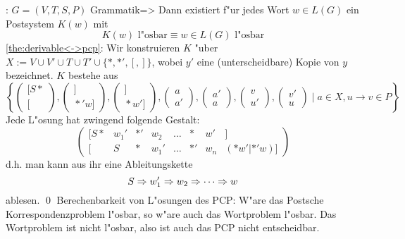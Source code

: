 \theorem:
  $G=(V,T,S,P)$ Grammatik=>{
  \label{the:derivable<->pcp}
  Dann existiert f"ur jedes Wort $w\in L(G)$ ein Postsystem $K(w)$ mit
  \[K(w)\text{ l"osbar}\equiv w\in L(G)\text{ l"osbar}
    \]
  }
\proof \ref{the:derivable<->pcp}:{
  Wir konstruieren $K$ "uber $X := V \cup V' \cup T
  \cup T' \cup \{*, *', [, ]\}$, wobei $y'$ eine (unterscheidbare) 
  Kopie von $y$ bezeichnet. $K$ bestehe aus
  \[\left\{
      \begin{pmatrix}[S*\\{}[\end{pmatrix},
      \begin{pmatrix}]\\{} *'w]\end{pmatrix},
      \begin{pmatrix}]\\{} *w']\end{pmatrix},
      \begin{pmatrix}a\\a'\end{pmatrix},
      \begin{pmatrix}a'\\a\end{pmatrix},
      \begin{pmatrix}v\\u'\end{pmatrix},
      \begin{pmatrix}v'\\u\end{pmatrix} \mid a \in X, u \to v \in P 
      \right\}
    \]
  Jede L"osung hat zwingend folgende Gestalt:
  \[\left(\begin{array}{c|c|c|c|c|c|c|c}
      [S* & w_1' & *' & w_2  &\dots & * & w' & ]\\{}
      [   & S    & *  & w_1' & \dots & *' & w_n & (* w'|*' w)]
      \end{array}\right)
    \]
  d.h. man kann aus ihr eine Ableitungskette
  \[S\Rightarrow w_1'\Rightarrow w_2 \Rightarrow \cdots \Rightarrow w
    \] 
  ablesen. \qed
  }
\remark Berechenbarkeit von L"osungen des PCP:{
  W"are das Postsche Korrespondenzproblem l"osbar, so w"are auch das
  Wortproblem l"osbar. Das Wortproblem ist nicht l"osbar, also ist auch
  das PCP nicht entscheidbar.
  }
